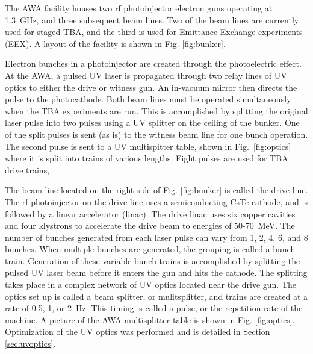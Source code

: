  \label{sec:facility}

The AWA facility houses two rf photoinjector electron guns operating
at \SI{1.3}{GHz}, and three subsequent beam lines. 
Two of the beam lines are currently used for staged TBA, and the
third is used for Emittance Exchange experiments (EEX). A layout of
the facility is shown in Fig. \ref{fig:bunker}. 

Electron bunches in a photoinjector are created through the photoelectric effect. 
At the AWA, a pulsed UV laser is propagated through two relay lines of UV optics to either
the drive or witness gun. An in-vacuum mirror then directs the pulse to the photocathode.
Both beam lines must be operated simultaneously when the TBA experiments are run. This is accomplished by
splitting the original laser pulse into two pulses using a UV splitter on the 
ceiling of the bunker. One of the split pulses is sent (as is) to the witness beam line for one
bunch operation. The second pulse is sent to a UV multispitter table, shown in 
Fig.~\ref{fig:optics} where it is split into trains of various lengths. Eight pulses are 
used for TBA drive trains, 

The beam line located on the right side of Fig. \ref{fig:bunker} is called the
drive line. The rf photoinjector on the drive line uses a semiconducting
CsTe cathode, and is followed by a linear accelerator (linac). The
drive linac uses six copper cavities and four klystrons to accelerate the drive beam
to energies of 50-\SI{70}{MeV}. The number of bunches generated from each 
laser pulse can vary from 1, 2, 4, 6, and 8 bunches. When multiple bunches
are generated, the grouping is called a bunch train. Generation of
these variable bunch trains is accomplished by splitting the pulsed
UV laser beam before it enters the gun and hits the cathode. The splitting
takes place in a complex network of UV optics located near the drive
gun. The optics set up is called a beam splitter, or mulitsplitter,
and trains are created at a rate of 0.5, 1, or \SI{2}{Hz}. This timing is
called a pulse, or the repetition rate of the machine. A picture of
the AWA multisplitter table is shown in Fig. \ref{fig:optics}. Optimization 
of the UV optics was performed and is detailed in Section \ref{sec:uvoptics}.  

